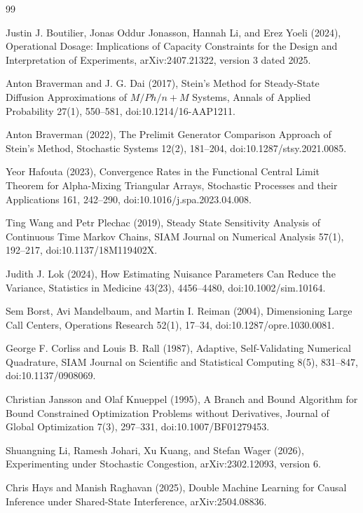 \documentclass{article}
\begin{document}
\begin{thebibliography}{99}

   Justin J. Boutilier, Jonas Oddur Jonasson, Hannah Li, and Erez Yoeli (2024), Operational Dosage: Implications of Capacity Constraints for the Design and Interpretation of Experiments, arXiv:2407.21322, version 3 dated 2025.

   Anton Braverman and J. G. Dai (2017), Stein's Method for Steady-State Diffusion Approximations of \(M/Ph/n+M\) Systems, Annals of Applied Probability 27(1), 550--581, doi:10.1214/16-AAP1211.

   Anton Braverman (2022), The Prelimit Generator Comparison Approach of Stein's Method, Stochastic Systems 12(2), 181--204, doi:10.1287/stsy.2021.0085.

   Yeor Hafouta (2023), Convergence Rates in the Functional Central Limit Theorem for Alpha-Mixing Triangular Arrays, Stochastic Processes and their Applications 161, 242--290, doi:10.1016/j.spa.2023.04.008.

   Ting Wang and Petr Plechac (2019), Steady State Sensitivity Analysis of Continuous Time Markov Chains, SIAM Journal on Numerical Analysis 57(1), 192--217, doi:10.1137/18M119402X.

   Judith J. Lok (2024), How Estimating Nuisance Parameters Can Reduce the Variance, Statistics in Medicine 43(23), 4456--4480, doi:10.1002/sim.10164.

   Sem Borst, Avi Mandelbaum, and Martin I. Reiman (2004), Dimensioning Large Call Centers, Operations Research 52(1), 17--34, doi:10.1287/opre.1030.0081.

   George F. Corliss and Louis B. Rall (1987), Adaptive, Self-Validating Numerical Quadrature, SIAM Journal on Scientific and Statistical Computing 8(5), 831--847, doi:10.1137/0908069.

   Christian Jansson and Olaf Knueppel (1995), A Branch and Bound Algorithm for Bound Constrained Optimization Problems without Derivatives, Journal of Global Optimization 7(3), 297--331, doi:10.1007/BF01279453.

   Shuangning Li, Ramesh Johari, Xu Kuang, and Stefan Wager (2026), Experimenting under Stochastic Congestion, arXiv:2302.12093, version 6.

   Chris Hays and Manish Raghavan (2025), Double Machine Learning for Causal Inference under Shared-State Interference, arXiv:2504.08836.


\end{thebibliography}
\end{document}
